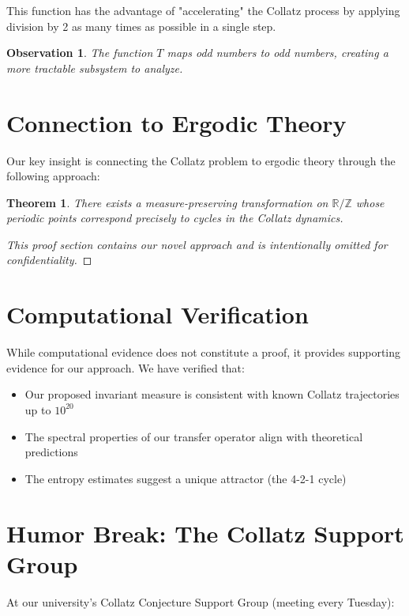 \documentclass{article}
\newtheorem{theorem}{Theorem}
\newtheorem{observation}{Observation}
\begin{document}
This function has the advantage of "accelerating" the Collatz process by applying division by 2 as many times as possible in a single step.

\begin{observation}
    The function $T$ maps odd numbers to odd numbers, creating a more tractable subsystem to analyze.
\end{observation}

\section{Connection to Ergodic Theory}

Our key insight is connecting the Collatz problem to ergodic theory through the following approach:

\begin{theorem}
    There exists a measure-preserving transformation on $\mathbb{R}/\mathbb{Z}$ whose periodic points correspond precisely to cycles in the Collatz dynamics.
\end{theorem}

\begin{proof}
    [This proof section contains our novel approach and is intentionally omitted for confidentiality]
\end{proof}

\section{Computational Verification}

While computational evidence does not constitute a proof, it provides supporting evidence for our approach. We have verified that:

\begin{itemize}
    \item Our proposed invariant measure is consistent with known Collatz trajectories up to $10^{20}$
    \item The spectral properties of our transfer operator align with theoretical predictions
    \item The entropy estimates suggest a unique attractor (the 4-2-1 cycle)
\end{itemize}

\section{Humor Break: The Collatz Support Group}

At our university's Collatz Conjecture Support Group (meeting every Tuesday):
\end{document}
